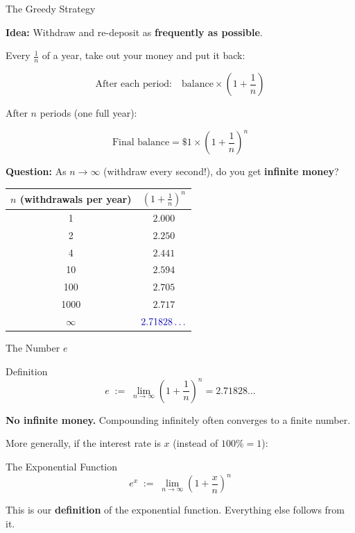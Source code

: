 \documentclass[10pt]{beamer}
\theoremstyle{definition}
\newcommand{\x}[1]{\alert{\textbf{#1}}}
\newcommand{\bl}[1]{{\color{blue!70!black}#1}}
\begin{document}
\begin{frame}[shrink=5]{The Greedy Strategy}

\textbf{Idea:} Withdraw and re-deposit as \x{frequently as possible}.

\vfill

Every $\frac{1}{n}$ of a year, take out your money and put it back:

$$\text{After each period:} \quad \text{balance} \times \left(1 + \frac{1}{n}\right)$$

After $n$ periods (one full year):

$$\text{Final balance} = \$1 \times \left(1 + \frac{1}{n}\right)^n$$

\vfill\pause

\textbf{Question:} As $n \to \infty$ (withdraw every second!), do you get \x{infinite money}?

\vfill\pause

\begin{center}
\renewcommand{\arraystretch}{1.4}
\begin{tabular}{c|c}
$n$ (withdrawals per year) & $\left(1+\frac{1}{n}\right)^n$ \\
\hline
1 & $2.000$ \\
2 & $2.250$ \\
4 & $2.441$ \\
10 & $2.594$ \\
100 & $2.705$ \\
1000 & $2.717$ \\
$\infty$ & $\bl{2.71828\ldots}$
\end{tabular}
\end{center}

\end{frame}


\begin{frame}{The Number $e$}

\begin{block}{Definition}
$$e \;:=\; \lim_{n\to\infty}\left(1+\frac{1}{n}\right)^n = 2.71828\ldots$$
\end{block}

\vfill

\x{No infinite money.} Compounding infinitely often converges to a finite number.

\vfill\pause

More generally, if the interest rate is $x$ (instead of $100\% = 1$):

\begin{block}{The Exponential Function}
$$e^x \;:=\; \lim_{n\to\infty}\left(1 + \frac{x}{n}\right)^n$$
\end{block}

\vfill

This is our \x{definition} of the exponential function. Everything else follows from it.

\end{frame}
\end{document}
